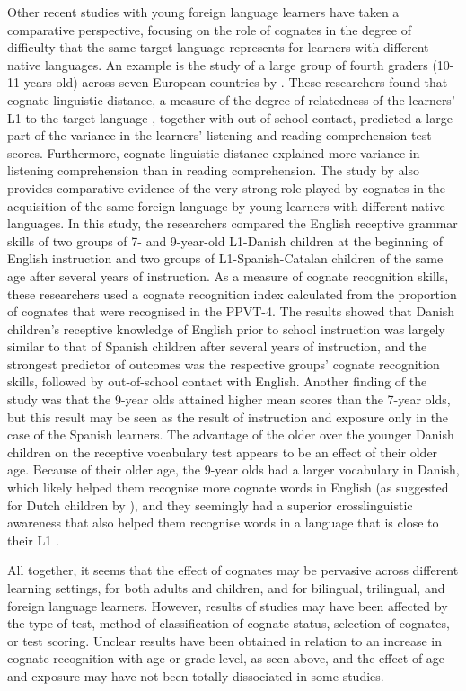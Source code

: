 \documentclass[output=paper,modfonts,nonflat,newtxmath]{langsci/langscibook}
\begin{document}
 {Other recent studies with young foreign language learners have taken a comparative perspective, focusing on the role of cognates in the degree of difficulty that the same target language represents for learners with different native languages. An example is the study of  a large group of fourth graders (10-11 years old) across seven European countries by \citet{LindgrenMuñoz2013}. These researchers found that cognate linguistic distance, a measure of the degree of relatedness of the learners’ L1 to the target language \citep{DyenEtAl1992}, together with out-of-school contact, predicted a large part of the variance in the learners’ listening and reading comprehension test scores. Furthermore, cognate linguistic distance explained more variance in listening comprehension than in reading comprehension. The study by \citet{MuñozEtAl2018} also provides comparative evidence of}{ }{the very strong role played by cognates in the acquisition of the same foreign language by young learners with different native languages}{. }{In this study, the researchers compared the English receptive grammar skills of two groups of 7- and 9-year-old L1-Danish children at the beginning of English instruction and two groups of L1-Spanish-Catalan children of the same age after several years of instruction. As a measure of cognate recognition skills, these researchers used a cognate recognition index calculated from the proportion of cognates that were recognised in the PPVT-4.}{ }{The results showed that Danish children’s receptive knowledge of English prior to school instruction was largely similar to that of Spanish children after several years of instruction, and the strongest predictor of outcomes was the respective groups’ cognate recognition skills, followed by out-of-school contact with English. Another finding of the study was that the 9-year olds attained higher mean scores than the 7-year olds, but this result may be seen as the result of instruction and exposure only in the case of the Spanish learners. The advantage of the older over the younger Danish children on the receptive vocabulary test appears to be an effect of their older age. Because of their older age, the 9-year olds had a larger vocabulary in Danish, which likely helped them recognise more cognate words in English (as suggested for Dutch children by \citealt{UnsworthEtAl2015}), and they seemingly had a superior crosslinguistic awareness that also helped them recognise words in a language that is close to their L1 \citep{Otwinowska2016}.}

 {All together, it seems that the effect of cognates may be pervasive across different learning settings, for both adults and children, and for bilingual, trilingual, and foreign language learners. However, results of studies may have been affected by the type of test, method of classification of cognate status, selection of cognates, or test scoring. Unclear results have been obtained in relation to an increase in cognate recognition with age or grade level, as seen above, and the effect of age and exposure may have not been totally dissociated in some studies.}
\end{document}
